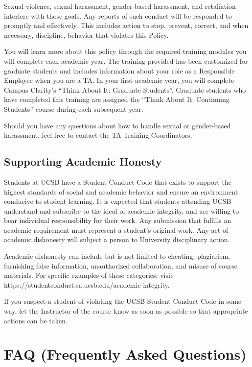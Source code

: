 \documentclass[
  letterpaper,
  DIV=11,
  numbers=noendperiod]{scrreprt}
\begin{document}
Sexual violence, sexual harassment, gender-based harassment, and
retaliation interfere with those goals. Any reports of such conduct will
be responded to promptly and effectively. This includes action to stop,
prevent, correct, and when necessary, discipline, behavior that violates
this Policy.

You will learn more about this policy through the required training
modules you will complete each academic year. The training provided has
been customized for graduate students and includes information about
your role as a Responsible Employee when you are a TA. In your first
academic year, you will complete Campus Clarity's ``Think About It:
Graduate Students''. Graduate students who have completed this training
are assigned the ``Think About It: Continuing Students'' course during
each subsequent year.

Should you have any questions about how to handle sexual or gender-based
harassment, feel free to contact the TA Training Coordinators.

\hypertarget{supporting-academic-honesty}{%
\chapter{Supporting Academic
Honesty}\label{supporting-academic-honesty}}

Students at UCSB have a Student Conduct Code that exists to support the
highest standards of social and academic behavior and ensure an
environment conducive to student learning. It is expected that students
attending UCSB understand and subscribe to the ideal of academic
integrity, and are willing to bear individual responsibility for their
work. Any submission that fulfills an academic requirement must
represent a student's original work. Any act of academic dishonesty will
subject a person to University disciplinary action.

Academic dishonesty can include but is not limited to cheating,
plagiarism, furnishing false information, unauthorized collaboration,
and misuse of course materials. For specific examples of these
categories, visit https://studentconduct.sa.ucsb.edu/academic-integrity.

If you suspect a student of violating the UCSB Student Conduct Code in
some way, let the Instructor of the course know as soon as possible so
that appropriate actions can be taken.

\part{\textbf{FAQ (Frequently Asked Questions)}}
\end{document}
